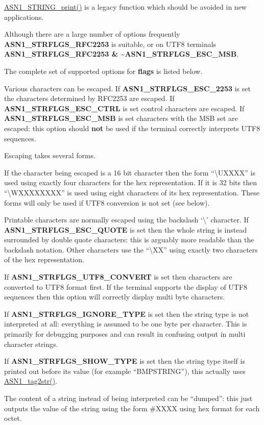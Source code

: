 \documentclass[]{article}
\let\realtextbf=\textbf
\renewcommand{\textbf}[1]{\textcolor{boldcolor}{\realtextbf{#1}}}
\renewcommand{\emph}[1]{\underline{#1}}
\begin{document}
\emph{ASN1\_STRING\_print()} is a legacy function which should be
avoided in new applications.

Although there are a large number of options frequently
\textbf{ASN1\_STRFLGS\_RFC2253} is suitable, or on UTF8 terminals
\textbf{ASN1\_STRFLGS\_RFC2253 \&
\textasciitilde{}ASN1\_STRFLGS\_ESC\_MSB}.

The complete set of supported options for \textbf{flags} is listed
below.

Various characters can be escaped. If \textbf{ASN1\_STRFLGS\_ESC\_2253}
is set the characters determined by RFC2253 are escaped. If
\textbf{ASN1\_STRFLGS\_ESC\_CTRL} is set control characters are escaped.
If \textbf{ASN1\_STRFLGS\_ESC\_MSB} is set characters with the MSB set
are escaped: this option should \textbf{not} be used if the terminal
correctly interprets UTF8 sequences.

Escaping takes several forms.

If the character being escaped is a 16 bit character then the form
``\textbackslash{}UXXXX'' is used using exactly four characters for the
hex representation. If it is 32 bits then ``\textbackslash{}WXXXXXXXX''
is used using eight characters of its hex representation. These forms
will only be used if UTF8 conversion is not set (see below).

Printable characters are normally escaped using the backslash
`\textbackslash{}' character. If \textbf{ASN1\_STRFLGS\_ESC\_QUOTE} is
set then the whole string is instead surrounded by double quote
characters: this is arguably more readable than the backslash notation.
Other characters use the ``\textbackslash{}XX'' using exactly two
characters of the hex representation.

If \textbf{ASN1\_STRFLGS\_UTF8\_CONVERT} is set then characters are
converted to UTF8 format first. If the terminal supports the display of
UTF8 sequences then this option will correctly display multi byte
characters.

If \textbf{ASN1\_STRFLGS\_IGNORE\_TYPE} is set then the string type is
not interpreted at all: everything is assumed to be one byte per
character. This is primarily for debugging purposes and can result in
confusing output in multi character strings.

If \textbf{ASN1\_STRFLGS\_SHOW\_TYPE} is set then the string type itself
is printed out before its value (for example ``BMPSTRING''), this
actually uses \emph{ASN1\_tag2str()}.

The content of a string instead of being interpreted can be ``dumped'':
this just outputs the value of the string using the form \#XXXX using
hex format for each octet.
\end{document}
